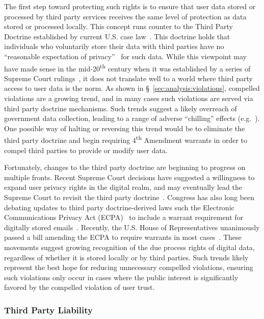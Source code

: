 The first step toward protecting such rights is to ensure that user
data stored or processed by third party services receives the same
level of protection as data stored or processed locally. This concept
runs counter to the Third Party Doctrine established by current
U.S. case law~\cite{thompson-thirdparty}. This doctrine holds that
individuals who voluntarily store their data with third parties have
no ``reasonable expectation of privacy''~\cite{scotus-katzvus} for
such data. While this viewpoint may have made sense in the
mid-20\textsuperscript{th} century when it was established by a series
of Supreme Court rulings~\cite{scotus-usvmiller-privacy,
  scotus-smithvmaryland}, it does not translate well to a world where
third party access to user data is the norm. As shown in
\S~\ref{sec:analysis:violations}, compelled violations are a growing
trend, and in many cases such violations are served via third party
doctrine mechanisms. Such trends suggest a likely overreach of
government data collection, leading to a range of adverse ``chilling''
effects (e.g.~\cite{penney2016}). One possible way of halting or
reversing this trend would be to eliminate the third party doctrine
and begin requiring 4\textsuperscript{th} Amendment warrants in order
to compel third parties to provide or modify user data.

Fortunately, changes to the third party doctrine are beginning to
progress on multiple fronts. Recent Supreme Court decisions have
suggested a willingness to expand user privacy rights in the digital
realm, and may eventually lead the Supreme Court to revisit the third
party doctrine~\cite{scotus-usvjones}.  Congress has also long been
debating updates to third party doctrine-derived laws such the
Electronic Communications Privacy Act (ECPA)~\cite{ecpa} to include a
warrant requirement for digitally stored
emails~\cite{eff-ecpareform}. Recently, the U.S. House of
Representatives unanimously passed a bill amending the ECPA to require
warrants in most cases~\cite{trujillo-ecpa}. These movements suggest
growing recognition of the due process rights of digital data,
regardless of whether it is stored locally or by third parties. Such
trends likely represent the best hope for reducing unnecessary
compelled violations, ensuring such violations only occur in cases
where the public interest is significantly favored by the compelled
violation of user trust.

\subsubsection{Third Party Liability}

